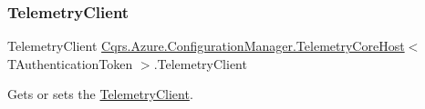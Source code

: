 \subsubsection{\texorpdfstring{Telemetry\+Client}{TelemetryClient}}
{\footnotesize\ttfamily Telemetry\+Client \hyperlink{classCqrs_1_1Azure_1_1ConfigurationManager_1_1TelemetryCoreHost}{Cqrs.\+Azure.\+Configuration\+Manager.\+Telemetry\+Core\+Host}$<$ T\+Authentication\+Token $>$.Telemetry\+Client\hspace{0.3cm}{\ttfamily [get]}}



Gets or sets the \hyperlink{classCqrs_1_1Azure_1_1ConfigurationManager_1_1TelemetryCoreHost_a8fe3736539c6f97ea4ac088cebbc19e5_a8fe3736539c6f97ea4ac088cebbc19e5}{Telemetry\+Client}. 

